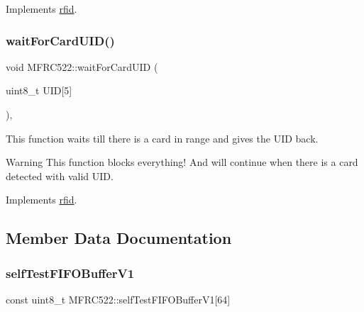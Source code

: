 Implements \mbox{\hyperlink{classrfid_a93e5430380a14fd652e7ca1ce6443198}{rfid}}.

\mbox{\label{class_m_f_r_c522_aeb05c83c2d139eb2c57f400399982691}} 
\subsubsection{\texorpdfstring{wait\+For\+Card\+U\+I\+D()}{waitForCardUID()}}
{\footnotesize\ttfamily void M\+F\+R\+C522\+::wait\+For\+Card\+U\+ID (\begin{DoxyParamCaption}\item[{uint8\+\_\+t}]{U\+ID\mbox{[}5\mbox{]} }\end{DoxyParamCaption})\hspace{0.3cm}{\ttfamily [override]}, {\ttfamily [virtual]}}



This function waits till there is a card in range and gives the U\+ID back. 

\begin{DoxyWarning}{Warning}
This function blocks everything! And will continue when there is a card detected with valid U\+ID. 
\end{DoxyWarning}


Implements \mbox{\hyperlink{classrfid_a1b324cb1e7b4c377eca4b3495d4189fd}{rfid}}.



\subsection{Member Data Documentation}
\mbox{\label{class_m_f_r_c522_a7d19c9869a7fbbe0d9825d5653d6af7b}} 
\subsubsection{\texorpdfstring{self\+Test\+F\+I\+F\+O\+Buffer\+V1}{selfTestFIFOBufferV1}}
{\footnotesize\ttfamily const uint8\+\_\+t M\+F\+R\+C522\+::self\+Test\+F\+I\+F\+O\+Buffer\+V1\mbox{[}64\mbox{]}}

